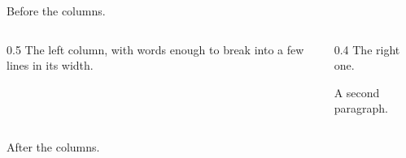 \documentclass{beamer}
\begin{document}
\begin{frame}
Before the columns.
\begin{columns}
\begin{column}{0.5\textwidth}
The left column, with words enough to break into a few lines in its width.
\end{column}
\begin{column}{0.4\textwidth}
The right one.

A second paragraph.
\end{column}
\end{columns}
After the columns.
\end{frame}
\end{document}
